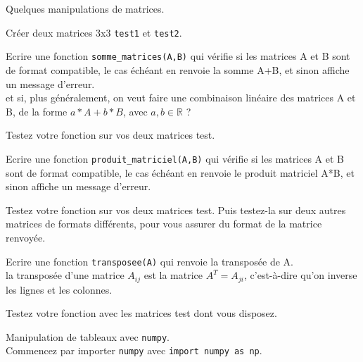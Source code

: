 

Quelques manipulations de matrices.

\ques Créer deux matrices 3x3 \verb!test1! et \verb!test2!.

\quessques Ecrire une fonction \verb!somme_matrices(A,B)! qui vérifie si les matrices A et B sont de format compatible, le cas échéant en renvoie la somme A+B, et sinon affiche un message d'erreur. \\

 et si, plus généralement, on veut faire une combinaison linéaire des matrices A et B, de la forme $a*A + b*B$, avec $a,b \in \mathds{R} $ ?

\ssques Testez votre fonction sur vos deux matrices test.

\quessques Ecrire une fonction \verb!produit_matriciel(A,B)! qui vérifie si les matrices A et B sont de format compatible, le cas échéant en renvoie le produit matriciel A*B, et sinon affiche un message d'erreur.

\ssques Testez votre fonction sur vos deux matrices test. Puis testez-la sur deux autres matrices de formats différents, pour vous assurer du format de la matrice renvoyée.

\quessques Ecrire une fonction \verb!transposee(A)! qui renvoie la transposée de A. \\
 la transposée d'une matrice $A_{ij}$ est la matrice $A^T = A_{ji}$, c'est-à-dire qu'on inverse les lignes et les colonnes.

\ssques Testez votre fonction avec les matrices test dont vous disposez.

Manipulation de tableaux avec \verb!numpy!. \\
Commencez par importer \verb!numpy! avec \verb!import numpy as np!. \\


